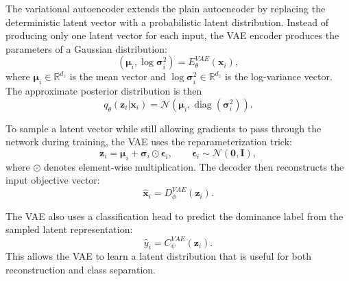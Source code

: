The variational autoencoder extends the plain autoencoder by replacing the deterministic latent vector with a probabilistic latent distribution. Instead of producing only one latent vector for each input, the VAE encoder produces the parameters of a Gaussian distribution:
\begin{equation}
    (\boldsymbol{\mu}_i, \log \boldsymbol{\sigma}_i^{2})
    =
    E_{\theta}^{VAE}(\mathbf{x}_i),
    \label{eq:vae_encoder_params}
\end{equation}
where $\boldsymbol{\mu}_i \in \mathbb{R}^{d_z}$ is the mean vector and $\log \boldsymbol{\sigma}_i^{2} \in \mathbb{R}^{d_z}$ is the log-variance vector. The approximate posterior distribution is then
\begin{equation}
    q_{\theta}(\mathbf{z}_i|\mathbf{x}_i)
    =
    \mathcal{N}
    \left(
        \boldsymbol{\mu}_i,
        \operatorname{diag}(\boldsymbol{\sigma}_i^{2})
    \right).
    \label{eq:vae_latent_distribution}
\end{equation}

To sample a latent vector while still allowing gradients to pass through the network during training, the VAE uses the reparameterization trick:
\begin{equation}
    \mathbf{z}_i
    =
    \boldsymbol{\mu}_i
    +
    \boldsymbol{\sigma}_i \odot \boldsymbol{\epsilon}_i,
    \qquad
    \boldsymbol{\epsilon}_i \sim \mathcal{N}(\mathbf{0}, \mathbf{I}),
    \label{eq:vae_reparameterization}
\end{equation}
where $\odot$ denotes element-wise multiplication. The decoder then reconstructs the input objective vector:
\begin{equation}
    \hat{\mathbf{x}}_i
    =
    D_{\phi}^{VAE}(\mathbf{z}_i).
    \label{eq:vae_decoder}
\end{equation}

The VAE also uses a classification head to predict the dominance label from the sampled latent representation:
\begin{equation}
    \hat{y}_i
    =
    C_{\psi}^{VAE}(\mathbf{z}_i).
    \label{eq:vae_classifier}
\end{equation}
This allows the VAE to learn a latent distribution that is useful for both reconstruction and class separation.

